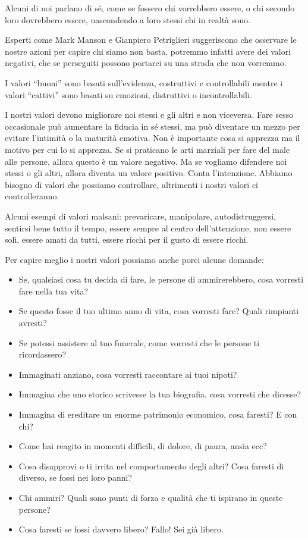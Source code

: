 \documentclass[12pt]{book} %
\begin{document}
Alcuni di noi parlano di sé, come se fossero chi vorrebbero essere, o chi secondo loro dovrebbero essere, nascondendo a
loro stessi chi in realtà sono.

Esperti come Mark Manson e Gianpiero Petriglieri suggeriscono che osservare le nostre azioni per capire chi siamo non
basta, potremmo infatti avere dei valori negativi, che se perseguiti possono portarci su una strada che non vorremmo.

I valori “buoni” sono basati sull'evidenza, costruttivi e controllabili mentre i valori “cattivi”
sono basati su emozioni, distruttivi o incontrollabili.

I nostri valori devono migliorare noi stessi e gli altri e non viceversa. Fare sesso occasionale può aumentare la
fiducia in sé stessi, ma può diventare un mezzo per evitare l'intimità o la maturità emotiva. Non
è importante cosa si apprezza ma il motivo per cui lo si apprezza. Se si praticano le arti marziali per fare del male
alle persone, allora questo è un valore negativo. Ma se vogliamo difendere noi stessi o gli altri, allora diventa un
valore positivo. Conta l'intenzione. Abbiamo bisogno di valori che possiamo controllare,
altrimenti i nostri valori ci controlleranno.


\bigskip

Alcuni esempi di valori malsani: prevaricare, manipolare, autodistruggersi, sentirsi bene tutto il tempo, essere sempre
al centro dell'attenzione, non essere soli, essere amati da tutti, essere ricchi per il gusto di
essere ricchi.


\bigskip

Per capire meglio i nostri valori possiamo anche porci alcune domande:

\begin{itemize}
\item Se, qualsiasi cosa tu decida di fare, le persone di ammirerebbero, cosa vorresti fare nella tua vita?
\item Se questo fosse il tuo ultimo anno di vita, cosa vorresti fare? Quali rimpianti avresti?
\item Se potessi assistere al tuo funerale, come vorresti che le persone ti ricordassero?
\item Immaginati anziano, cosa vorresti raccontare ai tuoi nipoti?
\item Immagina che uno storico scrivesse la tua biografia, cosa vorresti che dicesse?
\item Immagina di ereditare un enorme patrimonio economico, cosa faresti? E con chi?
\item Come hai reagito in momenti difficili, di dolore, di paura, ansia ecc?
\item Cosa disapprovi o ti irrita nel comportamento degli altri? Cosa faresti di diverso, se fossi nei loro panni?
\item Chi ammiri? Quali sono punti di forza e qualità che ti ispirano in queste persone?
\item Cosa faresti se fossi davvero libero? Fallo! Sei già libero.
\end{itemize}
\end{document}

